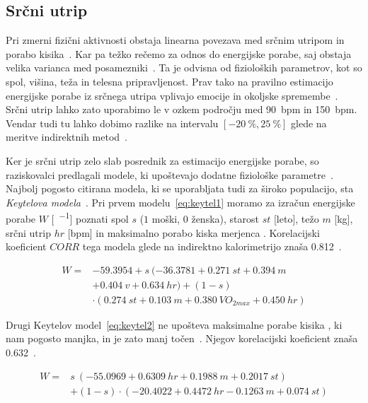 \subsection{Srčni utrip}\label{sec:srcni-utrip}
Pri zmerni fizični aktivnosti obstaja linearna povezava med srčnim utripom in porabo kisika~\cite{keytel2005prediction}. Kar pa težko rečemo za odnos do energijske porabe, saj obstaja velika varianca med posamezniki~\cite{levine2005measurement}. Ta je odvisna od fizioloških parametrov, kot so spol, višina, teža in telesna pripravljenost. Prav tako na pravilno estimacijo energijske porabe iz srčnega utripa vplivajo emocije in okoljske spremembe~\cite{keytel2005prediction}. Srčni utrip lahko zato uporabimo le v ozkem področju med \SI{90}{bpm} in \SI{150}{bpm}. Vendar tudi tu lahko dobimo razlike na intervalu $[-20~\% , 25~\%]$ glede na meritve indirektnih metod~\cite{keytel2005prediction}. 

Ker je srčni utrip zelo slab posrednik za estimacijo energijske porabe, so raziskovalci predlagali modele, ki upoštevajo dodatne fiziološke parametre~\cite{charlot2014improvement}. Najbolj pogosto citirana modela, ki se uporabljata tudi za široko populacijo, sta \emph{Keytelova modela}~\cite{keytel2005prediction}. Pri prvem modelu~\eqref{eq:keytel1} moramo za izračun energijske porabe $W$ [\si{\kcal\per\min}] poznati spol $s$ ($1$ moški, $0$ ženska), starost $st$ [leto], težo $m$ [\si{\kg}], srčni utrip $hr$ [\si{bpm}] in maksimalno porabo kiska merjenca \vomax [\si{\ml\per\kg\per\min}]. Korelacijski koeficient $CORR$ tega modela glede na indirektno kalorimetrijo znaša \num{0.812}~\cite{charlot2014improvement}.

\begin{align} \label{eq:keytel1}
W = & \num{-59.3954} + s~(\num{-36.3781} + \num{0.271}~st + \num{0.394}~m  \nonumber \\
& + \num{0.404}~v + \num{0.634}~hr ) + (1 - s) \nonumber \\
&\cdot (\num{0.274}~st + \num{0.103}~m + \num{0.380}~VO_{2max} + \num{0.450}~hr)
\end{align}

Drugi Keytelov model~\eqref{eq:keytel2} ne upošteva maksimalne porabe kisika \vomax, ki nam pogosto manjka, in je zato manj točen~\cite{keytel2005prediction}. Njegov korelacijski koeficient \corr znaša \num{0.632}~\cite{charlot2014improvement}.

\begin{align}\label{eq:keytel2}
 W = & s~(\num{-55.0969} + \num{0.6309}~hr + \num{0.1988}~m + \num{0.2017}~st) \nonumber \\
 & + (1 - s) \cdot (\num{-20.4022} + \num{0.4472}~hr - \num{0.1263}~m + \num{0.074}~st)
\end{align}

